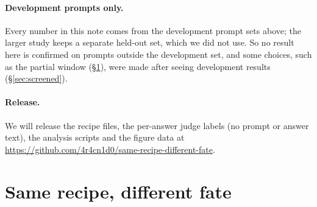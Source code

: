 \documentclass{article}
\begin{document}
\paragraph{Development prompts only.} Every number in this note comes from the
development prompt sets above; the larger study keeps a separate held-out set,
which we did not use. So no result here is confirmed on prompts outside the
development set, and some choices, such as the partial window
(\S\ref{sec:family}), were made after seeing development results
(\S\ref{sec:screened}).

\paragraph{Release.} We will release the recipe files, the per-answer judge labels
(no prompt or answer text), the analysis scripts and the figure data at
\url{https://github.com/4r4cn1d0/same-recipe-different-fate}.

\section{Same recipe, different fate}
\label{sec:family}
\end{document}
